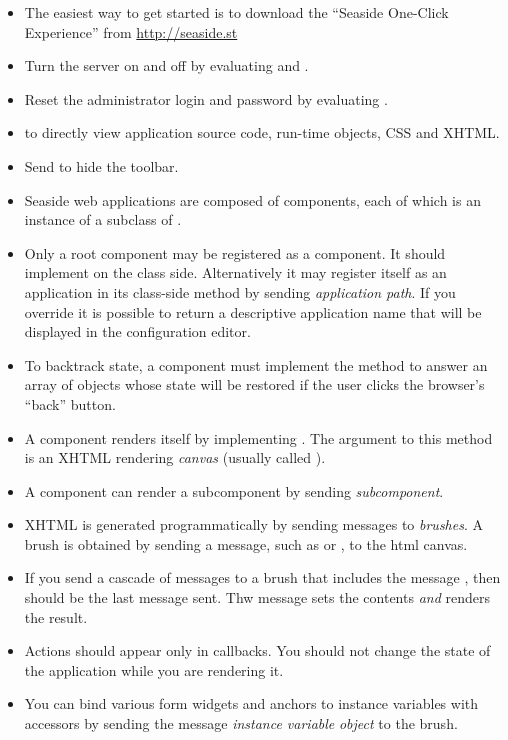 \documentclass[a4paper,10pt,twoside]{book}
\begin{document}
\begin{itemize}
  \item The easiest way to get started is to download the ``Seaside One-Click Experience'' from \url{http://seaside.st}
  \item Turn the server on and off by evaluating  and .
  \item Reset the administrator login and password by evaluating .
  \item {} to directly view application source code, run-time objects, CSS and XHTML.
  \item Send  to hide the toolbar.
  \item Seaside web applications are composed of components, each of which is an instance of a subclass of .
  \item Only a root component may be registered as a component. It should implement  on the class side. Alternatively it may register itself as an application in its class-side  method by sending  \emph{application path}.
  If you override  it is possible to return a descriptive application name that will be displayed in the configuration editor.
  \item To backtrack state, a component must implement the  method to answer an array of objects whose state will be restored if the user clicks the browser's ``back'' button.
  \item A component renders itself by implementing .
  The argument to this method is an XHTML rendering \emph{canvas} (usually called ).
  \item A component can render a subcomponent by sending  \emph{subcomponent}.
  \item XHTML is generated programmatically by sending messages to \emph{brushes}. A brush is obtained by sending a message, such as  or , to the html canvas.
  \item If you send a cascade of messages to a brush that includes the message , then  should be the last message sent.
  Thw  message sets the contents \emph{and} renders the result.
  \item Actions should appear only in callbacks.
You should not change the state of the application while you are rendering it.
  \item You can bind various form widgets and anchors to instance variables with accessors by sending the message  \emph{instance variable}  \emph{object} to the brush.

\end{itemize}
\end{document}
